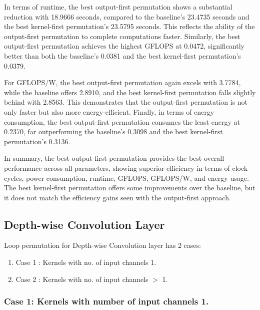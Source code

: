 In terms of runtime, the best output-first permutation shows a substantial reduction with 18.9666 seconds, compared to the baseline's 23.4735 seconds and the best kernel-first permutation's 23.5795 seconds. This reflects the ability of the output-first permutation to complete computations faster. Similarly, the best output-first permutation achieves the highest GFLOPS at 0.0472, significantly better than both the baseline's 0.0381 and the best kernel-first permutation's 0.0379.

For GFLOPS/W, the best output-first permutation again excels with 3.7784, while the baseline offers 2.8910, and the best kernel-first permutation falls slightly behind with 2.8563. This demonstrates that the output-first permutation is not only faster but also more energy-efficient. Finally, in terms of energy consumption, the best output-first permutation consumes the least energy at 0.2370, far outperforming the baseline's 0.3098 and the best kernel-first permutation's 0.3136.

In summary, the best output-first permutation provides the best overall performance across all parameters, showing superior efficiency in terms of clock cycles, power consumption, runtime, GFLOPS, GFLOPS/W, and energy usage. The best kernel-first permutation offers some improvements over the baseline, but it does not match the efficiency gains seen with the output-first approach.

\subsection{Depth-wise Convolution Layer}


Loop permutation for Depth-wise Convolution layer has 2 cases:
\begin{enumerate}
 \item Case 1 : Kernels with no. of input channels 1.
 \item Case 2 : Kernels with no. of input channels $>$ 1.
\end{enumerate}


\subsubsection{Case 1: Kernels with number of input channels 1.}


